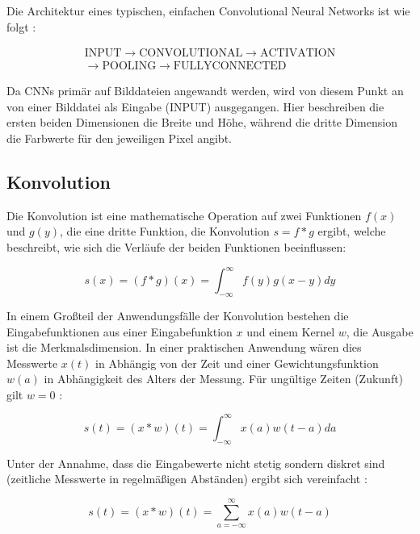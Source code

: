 

Die Architektur eines typischen, einfachen Convolutional Neural Networks ist wie folgt \cite{cs231n}:

\begin{multline*}
\mathrm{INPUT}\rightarrow\mathrm{CONVOLUTIONAL}\rightarrow\mathrm{ACTIVATION}\\\rightarrow\mathrm{POOLING}\rightarrow\mathrm{FULLYCONNECTED}
\end{multline*}

Da CNNs primär auf Bilddateien angewandt werden, wird von diesem Punkt an von einer Bilddatei als Eingabe (INPUT) ausgegangen. Hier beschreiben die ersten beiden Dimensionen die Breite und Höhe, während die dritte Dimension die Farbwerte für den jeweiligen Pixel angibt.

\subsection{Konvolution}
\label{ssec:conv}

Die Konvolution ist eine mathematische Operation auf zwei Funktionen $f(x)$ und $g(y)$, die eine dritte Funktion, die Konvolution $s = f*g$ ergibt, welche beschreibt, wie sich die Verläufe der beiden Funktionen beeinflussen:

\begin{equation}
s(x) = (f*g)(x) = \int_{-\infty}^{\infty} f(y)g(x-y)dy
\end{equation}

In einem Großteil der Anwendungsfälle der Konvolution bestehen die Eingabefunktionen aus einer Eingabefunktion $x$ und einem Kernel $w$, die Ausgabe ist die Merkmalsdimension. In einer praktischen Anwendung wären dies \bspw Messwerte $x(t)$ in Abhängig von der Zeit und einer Gewichtungsfunktion $w(a)$ in Abhängigkeit des Alters der Messung. Für ungültige Zeiten (\bspw Zukunft) gilt $w=0$ \cite[Kap.~9]{deeplearning_16}:

\begin{equation}
s(t) = (x*w)(t) = \int_{-\infty}^{\infty} x(a)w(t-a)da
\end{equation}

Unter der Annahme, dass die Eingabewerte nicht stetig sondern diskret sind (\bspw zeitliche Messwerte in regelmäßigen Abständen) ergibt sich vereinfacht \cite[Kap.~9]{deeplearning_16}:

\begin{equation}
s(t) = (x*w)(t) = \sum_{a=-\infty}^{\infty}x(a)w(t-a)
\end{equation}

